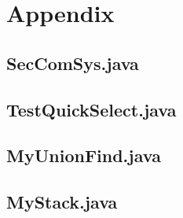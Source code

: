 \documentclass[a5paper]{article}
\begin{document}
\section{Appendix}
\subsection{SecComSys.java}\label{sec:akka}

\subsection{TestQuickSelect.java}

\subsection{MyUnionFind.java}\label{sec:myunionfind}

\subsection{MyStack.java}

\end{document}
